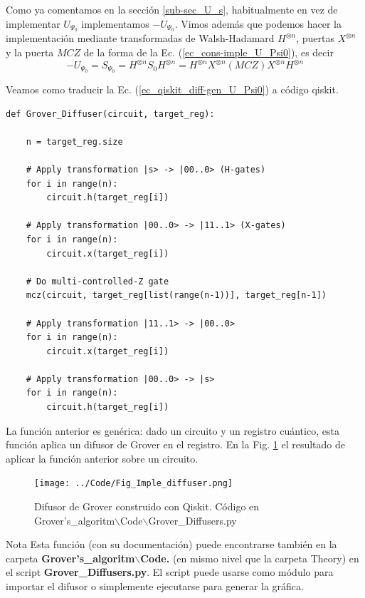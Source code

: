 \documentclass[a4paper,11pt]{article} %
\numberwithin{equation}{section}
\begin{document}
Como ya comentamos en la sección \ref{sub-sec_U_s}, habitualmente en vez de implementar $U_{\Psi_0}$ implementamos $-U_{\Psi_0}$. Vimos además que podemos hacer la implementación mediante transformadas de Walsh-Hadamard $H^{\otimes n}$, puertas $X^{\otimes n}$ y la puerta $MCZ$ de la forma de la Ec. (\ref{ec_cons-imple_U_Psi0}), es decir
\begin{equation} \label{ec_qiskit_diff-gen_U_Psi0}
\boxed{-U_{\Psi_0}  = S_{\Psi_0}  = H^{\otimes n} S_0 H^{\otimes n} = H^{\otimes n} X^{\otimes n} (MCZ) X^{\otimes n} H^{\otimes n}} 
\end{equation} 

Veamos como traducir la Ec. (\ref{ec_qiskit_diff-gen_U_Psi0}) a código qiskit. 
\begin{lstlisting}
def Grover_Diffuser(circuit, target_reg):
	
	n = target_reg.size

	# Apply transformation |s> -> |00..0> (H-gates)
	for i in range(n):
		circuit.h(target_reg[i])

	# Apply transformation |00..0> -> |11..1> (X-gates)
	for i in range(n):
		circuit.x(target_reg[i])

	# Do multi-controlled-Z gate
	mcz(circuit, target_reg[list(range(n-1))], target_reg[n-1])

	# Apply transformation |11..1> -> |00..0>
	for i in range(n):
		circuit.x(target_reg[i])

	# Apply transformation |00..0> -> |s>
	for i in range(n):
		circuit.h(target_reg[i])

\end{lstlisting}


La función anterior es genérica: dado un circuito y un registro cuántico, esta función aplica un difusor de Grover en el registro. En la Fig. \ref{Fig_Imple_diffuser} el resultado de aplicar la función anterior sobre un circuito.


	\begin{figure}[H]
	\centering 
	\texttt{[image: ../Code/Fig\_Imple\_diffuser.png]}
	\caption{Difusor de Grover construido con Qiskit. Código en Grover's\_algoritm$\backslash$Code$\backslash$Grover\_Diffusers.py}
	\label{Fig_Imple_diffuser}
	\end{figure}

	\begin{mybox}{Nota}
	Esta función (con su documentación) puede encontrarse también en la carpeta 
	\textbf{Grover's\_algoritm$\backslash$Code.} (en mismo nivel que la carpeta Theory) en el script  \textbf{Grover\_Diffusers.py}. 
	El script puede usarse como módulo para importar el difusor o simplemente ejecutarse para generar la gráfica. 
	\end{mybox}
\end{document}
